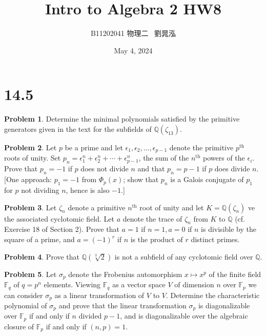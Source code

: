\documentclass{article}
\title{Intro to Algebra 2 HW8}
\author{B11202041 物理二 \, 劉晁泓}
\date{May 4, 2024}
\theoremstyle{definition}
\newtheorem{prob}{Problem}
\newcommand{\FF}{\mathbb F}
\newcommand{\QQ}{\mathbb Q}
\begin{document}
\maketitle
\thispagestyle{fancy}
\renewcommand{\footrulewidth}{0.4pt}
\cfoot{\thepage}
\renewcommand{\headrulewidth}{0.4pt}

\section*{14.5}

\begin{prob}
	Determine the minimal polynomials satisfied by the primitive generators given in the text for the subfields of $\QQ(\zeta_{13})$.
\end{prob}

\setcounter{prob}{4}
\begin{prob}
	Let $p$ be a prime and let $\epsilon_1, \epsilon_2, ..., \epsilon_{p - 1}$ denote the primitive $p^{\text{th}}$ roots of unity.
	Set $p_n = \epsilon_1^n + \epsilon_2^n + \cdots + \epsilon_{p - 1}^n$, the sum of the $n^{\text{th}}$ powers of the $\epsilon_i$.
	Prove that $p_n = -1$ if $p$ does not divide $n$ and that $p_n = p - 1$ if $p$ does divide $n$.
	[One approach: $p_1 = -1$ from $\Phi_p(x)$; show that $p_n$ is a Galois conjugate of $p_1$ for $p$ not dividing $n$, hence is also $-1$.]
\end{prob}

\begin{prob}
	Let $\zeta_n$ denote a primitive $n^{\text{th}}$ root of unity and let $K = \QQ(\zeta_n)$ ve the associated cyclotomic field.
	Let $a$ denote the trace of $\zeta_n$ from $K$ to $\QQ$ (cf. Exercise 18 of Section 2).
	Prove that $a = 1$ if $n = 1, a = 0$ if $n$ is divisible by the square of a prime, and $a = (-1)^r$ if $n$ is the product of $r$ distinct primes.
\end{prob}

\setcounter{prob}{9}
\begin{prob}
	Prove that $\QQ(\sqrt[3]{2})$ is not a subfield of any cyclotomic field over $\QQ$.
\end{prob}

\setcounter{prob}{11}
\begin{prob}
	Let $\sigma_p$ denote the Frobenius automorphism $x \mapsto x^p$ of the finite field $\FF_q$ of $q = p^n$ elements.
	Viewing $\FF_q$ as a vector space $V$ of dimension $n$ over $\FF_p$ we can consider $\sigma_p$ as a linear transformation of $V$ to $V$.
	Determine the characteristic polynomial of $\sigma_p$ and prove that the linear transformation $\sigma_p$ is diagonalizable over $\FF_p$ if and only if $n$ divided $p - 1$, and is diagonalizable over the algebraic closure of $\FF_p$ if and only if $(n, p) = 1$.
\end{prob}
\end{document}
